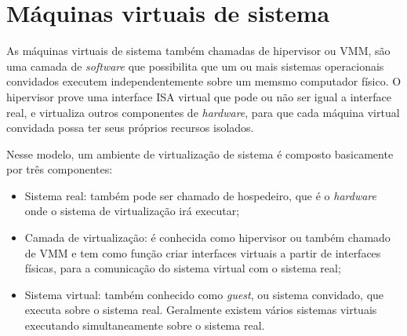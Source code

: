 
\section{Máquinas virtuais de sistema}
\label{section:virtsistema}

As máquinas virtuais de sistema também chamadas de hipervisor ou \ac{VMM}, são uma camada de \textit{software} que possibilita
que um ou mais sistemas operacionais convidados executem independentemente sobre um memsmo computador físico. O hipervisor prove uma interface
\ac{ISA} virtual que pode ou não ser igual a interface real, e virtualiza outros componentes de \textit{hardware}, para que cada máquina
virtual convidada possa ter seus próprios recursos isolados.

Nesse modelo, um ambiente de virtualização de sistema é composto basicamente por três componentes:
\begin{itemize}
 \item Sistema real: também pode ser chamado de hospedeiro, que é o \textit{hardware} onde o sistema de virtualização irá executar;
 \item Camada de virtualização: é conhecida como hipervisor ou também chamado de \ac{VMM} e tem como função criar interfaces virtuais a
 partir de interfaces físicas, para a comunicação do sistema virtual com o sistema real;
 \item Sistema virtual: também conhecido como \textit{guest}, ou sistema convidado, que executa sobre o sistema real. Geralmente
 existem vários sistemas virtuais executando simultaneamente sobre o sistema real.
\end{itemize}

